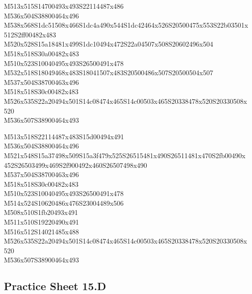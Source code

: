 \documentclass{article}
\begin{document}
\begin{multicols}{5}
\begin{center}
M513x515S14700493x493S22114487x486 %
\\M536x504S38800464x496 %
\\M538x568S1dc51508x466S1dc4a490x544S1dc42464x526S20500475x553S22b03501x512S2ff00482x483 %
\\M520x528S15a18481x499S1dc10494x472S22a04507x508S20602496x504 %
\\M518x518S30a00482x483 %
\\M510x523S10040495x493S26500491x478 %
\\M532x518S18049468x483S18041507x483S20500486x507S20500504x507 %
\\M537x504S38700463x496 %
\\M518x518S30c00482x483 %
\\M526x535S22a20494x501S14c08474x465S14c00503x465S20338478x520S20330508x520 %
\\M536x507S38900464x493 %
\vfil
\columnbreak

M513x518S22114487x483S15d00494x491 %
\\M536x504S38800464x496 %
\\M521x548S15a37498x509S15a3f479x525S26515481x490S26511481x470S2fb00490x452S26503499x469S2f900492x460S26507498x490 %
\\M537x504S38700463x496 %
\\M518x518S30c00482x483 %
\\M510x523S10040495x493S26500491x478 %
\\M514x524S10620486x476S23004489x506 %
\\M508x510S1fb20493x491 %
\\M511x510S19220490x491 %
\\M516x512S14021485x488 %
\\M526x535S22a20494x501S14c08474x465S14c00503x465S20338478x520S20330508x520 %
\\M536x507S38900464x493 %
\vfil

\end{center}
\end{multicols}

\subsection{Practice Sheet 15.D}
\end{document}
